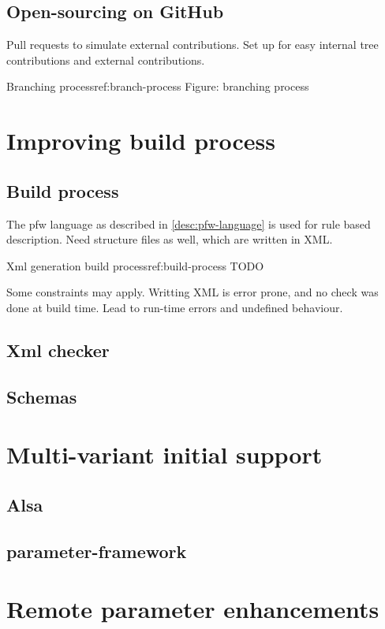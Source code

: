 \subsection{Open-sourcing on GitHub}
Pull requests to simulate external contributions.
Set up for easy internal tree contributions and external contributions.

\begin{figureGraphics}{Branching process}{ref:branch-process}
    Figure: branching process
\end{figureGraphics}

\section{Improving build process}
\subsection{Build process}
The pfw language as described in \ref{desc:pfw-language} is used for rule based
description. Need structure files as well, which are written in XML.

\begin{figureGraphics}{Xml generation build process}{ref:build-process}
    TODO
\end{figureGraphics}

Some constraints may apply. Writting XML is error prone, and no check was done at
build time. Lead to run-time errors and undefined behaviour.
\subsection{Xml checker}
\subsection{Schemas}

\section{Multi-variant initial support}
\subsection{Alsa}
\subsection{parameter-framework}

\section{Remote parameter enhancements}

